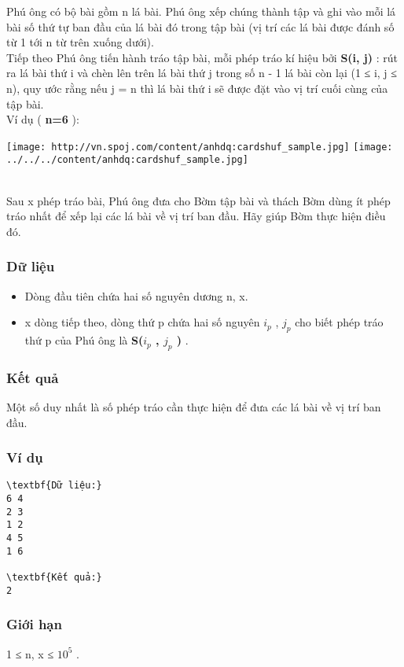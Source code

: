 

Phú ông có bộ bài gồm n lá bài. Phú ông xếp chúng thành tập và ghi vào mỗi lá bài số thứ tự ban đầu của lá bài đó trong tập bài (vị trí các lá bài được đánh số từ 1 tới n từ trên xuống dưới).
\\Tiếp theo Phú ông tiến hành tráo tập bài, mỗi phép tráo kí hiệu bởi \textbf{ S(i, j) } : rút ra lá bài thứ i và chèn lên trên lá bài thứ j trong số n - 1 lá bài còn lại (1 ≤ i, j ≤ n), quy ước rằng nếu j = n thì lá bài thứ i sẽ được đặt vào vị trí cuối cùng của tập bài.
\\Ví dụ ( \textbf{ n=6 } ):


\texttt{[image: http://vn.spoj.com/content/anhdq:cardshuf\_sample.jpg]}
\texttt{[image: ../../../content/anhdq:cardshuf\_sample.jpg]}


\\Sau x phép tráo bài, Phú ông đưa cho Bờm tập bài và thách Bờm dùng ít phép tráo nhất để xếp lại các lá bài về vị trí ban đầu. Hãy giúp Bờm thực hiện điều đó.

\subsubsection{Dữ liệu}
\begin{itemize}
	\item Dòng đầu tiên chứa hai số nguyên dương n, x.
	\item x dòng tiếp theo, dòng thứ p chứa hai số nguyên $i_{p}$ , $j_{p}$ cho biết phép tráo thứ p của Phú ông là \textbf{ S($i_{p}$ , $j_{p}$ ) } .
\end{itemize}

\subsubsection{Kết quả}

Một số duy nhất là số phép tráo cần thực hiện để đưa các lá bài về vị trí ban đầu.

\subsubsection{Ví dụ}
\begin{verbatim}
\textbf{Dữ liệu:}
6 4
2 3
1 2
4 5
1 6

\textbf{Kết quả:}
2
\end{verbatim}

\subsubsection{Giới hạn}

1 ≤ n, x ≤ $10^{5}$ .
